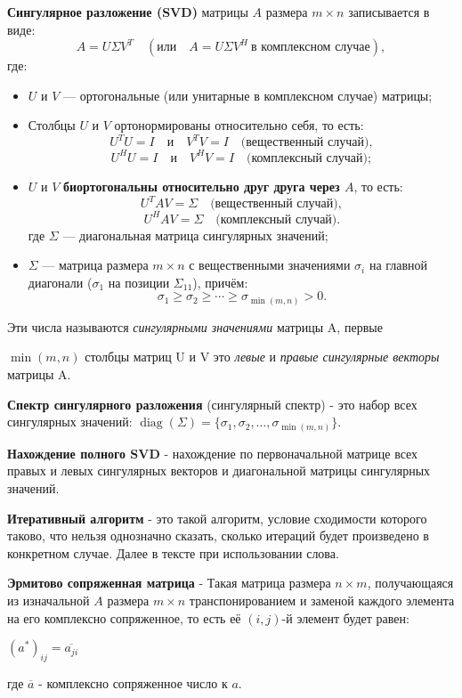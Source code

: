 \hspace{0.45cm} \textbf{Сингулярное разложение (SVD)} матрицы \( A \) размера \( m \times n \) записывается в виде:
\[
A = U \Sigma V^T \quad (\text{или} \quad A = U \Sigma V^H \ \text{в комплексном случае}),
\]
где:
\begin{itemize}
    \item \( U \) и \( V \) — ортогональные (или унитарные в комплексном случае) матрицы;
    \item Столбцы \( U \) и \( V \) ортонормированы относительно себя, то есть:
    \[
    U^T U = I \quad \text{и} \quad V^T V = I \quad \text{(вещественный случай)},
    \]
    \[
    U^H U = I \quad \text{и} \quad V^H V = I \quad \text{(комплексный случай)};
    \]
    \item \( U \) и \( V \) \textbf{биортогональны относительно друг друга через \( A \)}, то есть:
    \[
    U^T A V = \Sigma \quad \text{(вещественный случай)},
    \]
    \[
    U^H A V = \Sigma \quad \text{(комплексный случай)}.
    \]
    где \( \Sigma \) — диагональная матрица сингулярных значений;
    \item \( \Sigma \) — матрица размера \( m \times n \) с вещественными значениями \( \sigma_i \) на главной диагонали (\( \sigma_1 \) на позиции \( \Sigma_{11} \)), причём:
    \[
    \sigma_1 \geq \sigma_2 \geq \cdots \geq \sigma_{\min(m, n)} > 0.
    \]
\end{itemize}

Эти числа называются \textit{сингулярными значениями} матрицы A, первые 

\(\min(m,n)\) столбцы матриц U и V это \textit{левые} и \textit{правые сингулярные векторы} матрицы A.

\textbf{Спектр сингулярного разложения} (сингулярный спектр) - это набор всех сингулярных значений: \( \operatorname{diag}(\Sigma) = \{ \sigma_1, \sigma_2, \dots, \sigma_{\min(m, n)} \} \).

\textbf{Нахождение полного SVD} - нахождение по первоначальной матрице всех правых и левых сингулярных векторов и диагональной матрицы сингулярных значений. 

\textbf{Итеративный алгоритм} - это такой алгоритм, условие сходимости которого таково, что нельзя однозначно сказать, сколько итераций будет произведено в конкретном случае. Далее в тексте при использовании слова. 

\textbf{Эрмитово сопряженная матрица} - Такая матрица размера $n \times m$, получающаяся из изначальной $A$  размера $m \times n$ транспонированием и заменой каждого элемента на его комплексно сопряженное, то есть её $(i, j)$-й элемент будет равен:
\begin{center}
$(a^*)_{ij} = \overline{a_{ji}}$
\end{center}
где $\overline{a}$ - комплексно сопряженное число к $a$.


